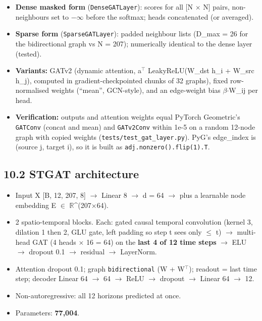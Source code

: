 \documentclass[10pt,a4paper]{article}
\begin{document}
\begin{itemize}[nosep,leftmargin=*]
\item \textbf{Dense masked form} (\texttt{DenseGATLayer}): scores for all [N \ensuremath{\times} N] pairs, non-neighbours set to \ensuremath{-}\ensuremath{\infty} before the softmax; heads concatenated (or averaged).
\item \textbf{Sparse form} (\texttt{SparseGATLayer}): padded neighbour lists (D\_\allowbreak{}max = 26 for the bidirectional graph vs N = 207); numerically identical to the dense layer (tested).
\item \textbf{Variants:} GATv2 (dynamic attention, a\ensuremath{^{\top}} LeakyReLU(W\_\allowbreak{}dst h\_\allowbreak{}i + W\_\allowbreak{}src h\_\allowbreak{}j), computed in gradient-checkpointed chunks of 32 graphs), fixed row-normalised weights (``mean'', GCN-style), and an edge-weight bias \ensuremath{\beta}\ensuremath{\cdot}W\_\allowbreak{}ij per head.
\item \textbf{Verification:} outputs and attention weights equal PyTorch Geometric's \texttt{GATConv} (concat and mean) and \texttt{GATv2Conv} within 1e-5 on a random 12-node graph with copied weights (\texttt{tests/\allowbreak{}test\_\allowbreak{}gat\_\allowbreak{}layer.py}). PyG's edge\_\allowbreak{}index is (source j, target i), so it is built as \texttt{adj.nonzero().flip(1).T}.
\end{itemize}

\subsection*{10.2 STGAT architecture}
\begin{itemize}[nosep,leftmargin=*]
\item Input X [B, 12, 207, 8] \ensuremath{\rightarrow} Linear 8 \ensuremath{\rightarrow} d = 64 \ensuremath{\rightarrow} plus a learnable node embedding E \ensuremath{\in} \ensuremath{\mathbb{R}}\^{}(207\ensuremath{\times}64).
\item 2 spatio-temporal blocks. Each: gated causal temporal convolution (kernel 3, dilation 1 then 2, GLU gate, left padding so step t sees only \ensuremath{\leq} t) \ensuremath{\rightarrow} multi-head GAT (4 heads \ensuremath{\times} 16 = 64) on the \textbf{last 4 of 12 time steps} \ensuremath{\rightarrow} ELU \ensuremath{\rightarrow} dropout 0.1 \ensuremath{\rightarrow} residual \ensuremath{\rightarrow} LayerNorm.
\item Attention dropout 0.1; graph \texttt{bidirectional} (W + W\ensuremath{^{\top}}); readout = last time step; decoder Linear 64 \ensuremath{\rightarrow} 64 \ensuremath{\rightarrow} ReLU \ensuremath{\rightarrow} dropout \ensuremath{\rightarrow} Linear 64 \ensuremath{\rightarrow} 12.
\item Non-autoregressive: all 12 horizons predicted at once.
\item Parameters: \textbf{77,004}.
\end{itemize}
\end{document}
